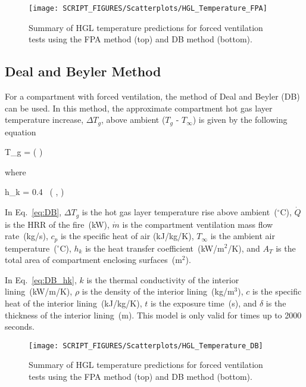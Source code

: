 \begin{figure}[h]
\begin{center}
\texttt{[image: SCRIPT\_FIGURES/Scatterplots/HGL\_Temperature\_FPA]}
\end{center}
\caption[Summary of HGL temperature predictions for forced ventilation tests]
{Summary of HGL temperature predictions for forced ventilation tests using the FPA method (top) and DB method (bottom).}
\label{HGL_Summary_Forced_Ventilation}
\end{figure}

\clearpage


\subsection{Deal and Beyler Method}

For a compartment with forced ventilation, the method of Deal and Beyler (DB) can be used. In this method, the approximate compartment hot gas layer temperature increase, $\Delta T_g$, above ambient ($T_g$ - $T_\infty$) is given by the following equation

\be
\Delta T_g = \left(  \right)
\label{eq:DB}
\ee

\noindent where

\be
h_k = 0.4\  \left(  ,  \right)
\label{eq:DB_hk}
\ee

In Eq.~\ref{eq:DB}, $\Delta T_g$ is the hot gas layer temperature rise above ambient~($^\circ$C), $\dot Q$ is the HRR of the fire~(kW), $\dot m$ is the compartment ventilation mass flow rate~(kg/s), $c_p$ is the specific heat of air (kJ/kg/K), $T_\infty$ is the ambient air temperature~($^\circ$C), $h_k$ is the heat transfer coefficient~(kW/m$^2$/K), and $A_T$ is the total area of compartment enclosing surfaces~(m$^2$).

In Eq.~\ref{eq:DB_hk}, $k$ is the thermal conductivity of the interior lining~(kW/m/K), $\rho$ is the density of the interior lining~(kg/m$^3$), $c$ is the specific heat of the interior lining~(kJ/kg/K), $t$ is the exposure time~(s), and $\delta$ is the thickness of the interior lining~(m). This model is only valid for times up to 2000 seconds.

\begin{figure}[ht]
\begin{center}
\texttt{[image: SCRIPT\_FIGURES/Scatterplots/HGL\_Temperature\_DB]}
\end{center}
\caption[Summary of HGL temperature predictions for forced ventilation tests]
{Summary of HGL temperature predictions for forced ventilation tests using the FPA method (top) and DB method (bottom).}
\label{HGL_Summary_Forced_Ventilation}
\end{figure}

